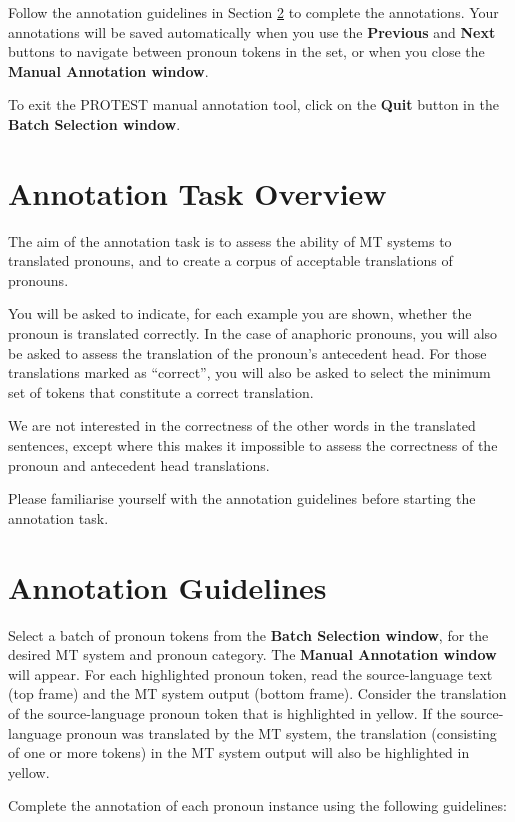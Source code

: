 \documentclass[11pt]{article} %
\begin{document}
Follow the annotation guidelines in Section \ref{AnnotationGuidelines} to complete the annotations. Your annotations will be saved automatically when you use the \textbf{Previous} and \textbf{Next} buttons to navigate between pronoun tokens in the set, or when you close the \textbf{Manual Annotation window}.

To exit the PROTEST manual annotation tool, click on the \textbf{Quit} button in the \textbf{Batch Selection window}.


\section{Annotation Task Overview}
The aim of the annotation task is to assess the ability of MT systems to translated pronouns, and to create a corpus of acceptable translations of pronouns.

You will be asked to indicate, for each example you are shown, whether the pronoun is translated correctly. In the case of anaphoric pronouns, you will also be asked to assess the translation of the pronoun's antecedent head. For those translations marked as ``correct'', you will also be asked to select the minimum set of tokens that constitute a correct translation.

We are not interested in the correctness of the other words in the translated sentences, except where this makes it impossible to assess the correctness of the pronoun and antecedent head translations.

Please familiarise yourself with the annotation guidelines before starting the annotation task.


\section{Annotation Guidelines}
\label{AnnotationGuidelines}
Select a batch of pronoun tokens from the \textbf{Batch Selection window}, for the desired MT system and pronoun category. The \textbf{Manual Annotation window} will appear. For each highlighted pronoun token, read the source-language text (top frame) and the MT system output (bottom frame). Consider the translation of the source-language pronoun token that is highlighted in yellow. If the source-language pronoun was translated by the MT system, the translation (consisting of one or more tokens) in the MT system output will also be highlighted in yellow.

Complete the annotation of each pronoun instance using the following guidelines:
\end{document}
